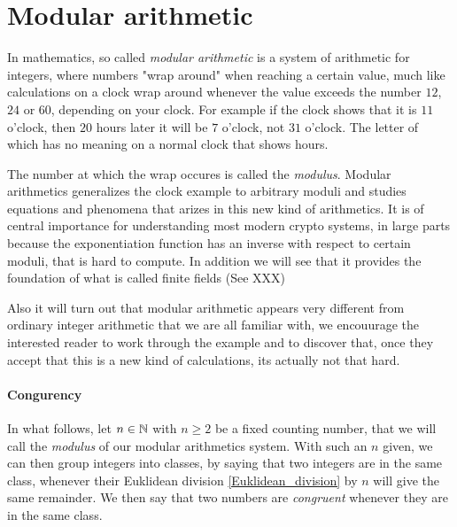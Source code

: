 \section{Modular arithmetic}
In mathematics, so called \textit{modular arithmetic} is a system of arithmetic for integers, where numbers "wrap around" when reaching a certain value, much like calculations on a clock wrap around whenever the value exceeds the number $12$, $24$ or $60$, depending on your clock. For example if the clock shows that it is $11$ o'clock, then $20$ hours later it will be $7$ o'clock, not $31$ o'clock. The letter of which has no meaning on a normal clock that shows hours. 

The number at which the wrap occures is called the \textit{modulus}. Modular arithmetics generalizes the clock example to arbitrary moduli and studies equations and phenomena that arizes in this new kind of arithmetics. It is of central importance for understanding most modern crypto systems, in large parts because the exponentiation function has an inverse with respect to certain moduli, that is hard to compute. In addition we will see that it provides the foundation of what is called finite fields (See XXX)

Also it will turn out that modular arithmetic appears very different from ordinary integer arithmetic that we are all familiar with, we encouurage the interested reader to work through the example and to discover that, once they accept that this is a new kind of calculations, its actually not that hard.
\paragraph{Congurency}
In what follows, let $n\in\mathbb{N}$ with $n\geq 2$ be a fixed counting number, that we will call the \textit{modulus} of our modular arithmetics system. With such an $n$ given, we can then group integers into classes, by saying that two integers are in the same class, whenever their Euklidean division \ref{Euklidean_division} by $n$ will give the same remainder. We then say that two numbers are \textit{congruent} whenever they are in the same class.

